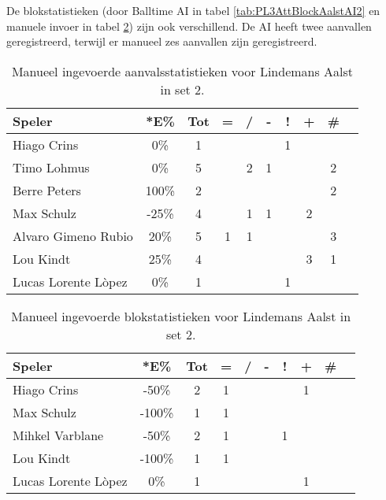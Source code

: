 De blokstatistieken (door Balltime AI in tabel \ref{tab:PL3AttBlockAalstAI2} en manuele invoer in tabel \ref{tab:PL3BlockAalstMan2}) zijn ook verschillend. De AI heeft twee aanvallen geregistreerd, terwijl er manueel zes aanvallen zijn geregistreerd. 

\begin{table}[ht!]
    \centering
    \scriptsize
    \begin{tabular}{|l|c|c|c|c|c|c|c|c|c|}
        \hline
        \textbf{Speler} & *E\% & Tot & = & / & - & ! & + & \# \\ \hline
        Hiago Crins & 0\% & 1 &  &  &  & 1 &  & \\ 
        Timo Lohmus & 0\% & 5 &  & 2 & 1 &  & & 2 \\ 
        Berre Peters & 100\% & 2 &  &  & & & & 2 \\ 
        Max Schulz & -25\% & 4 &  & 1 & 1 &  & 2 & \\ 
        Alvaro Gimeno Rubio & 20\% & 5 & 1 & 1 &  &  &  & 3 \\ 
        Lou Kindt & 25\% & 4 &  &  &  &  & 3 & 1 \\
        Lucas Lorente Lòpez & 0\% & 1 &  &  &  & 1 &  & \\ \hline
    \end{tabular}
    \caption[Manueel ingevoerde aanvalsstatistieken voor Lindemans Aalst in set 2]{\label{tab:PL3AttAalstMan2}Manueel ingevoerde aanvalsstatistieken voor Lindemans Aalst in set 2.}
\end{table}

\begin{table}[ht!]
    \centering
    \scriptsize
    \begin{tabular}{|l|c|c|c|c|c|c|c|c|c|}
        \hline
        \textbf{Speler} & *E\% & Tot & = & / & - & ! & + & \# \\ \hline
        Hiago Crins & -50\% & 2 & 1 &  &  &  & 1 &  \\
        Max Schulz & -100\% & 1 & 1 &  &  &  &  & \\
        Mihkel Varblane & -50\% & 2 & 1 &  &  & 1 &  & \\
        Lou Kindt & -100\% & 1 & 1 &  &  &  &  & \\
        Lucas Lorente Lòpez & 0\% & 1 &  &  &  &  & 1 & \\ \hline
    \end{tabular}
    \caption[Manueel ingevoerde blokstatistieken voor Lindemans Aalst in set 2]{\label{tab:PL3BlockAalstMan2}Manueel ingevoerde blokstatistieken voor Lindemans Aalst in set 2.}
\end{table}

